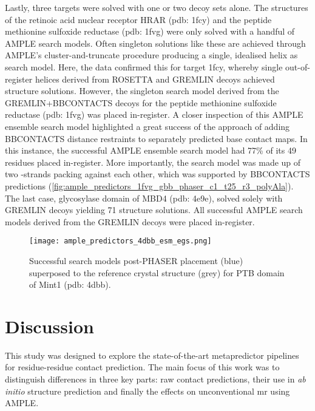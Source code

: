 Lastly, three targets were solved with one or two decoy sets alone. The structures of the retinoic acid nuclear receptor HRAR (\gls{pdb}: 1fcy) and the peptide methionine sulfoxide reductase (\gls{pdb}: 1fvg) were only solved with a handful of AMPLE search models. Often singleton solutions like these are achieved through AMPLE's cluster-and-truncate procedure producing a single, idealised helix as search model. Here, the data confirmed this for target 1fcy, whereby single out-of-register helices derived from ROSETTA and GREMLIN decoys achieved structure solutions. However, the singleton search model derived from the GREMLIN+BBCONTACTS decoys for the peptide methionine sulfoxide reductase (\gls{pdb}: 1fvg) was placed in-register. A closer inspection of this AMPLE ensemble search model highlighted a great success of the approach of adding BBCONTACTS distance restraints to separately predicted base contact maps. In this instance, the successful AMPLE ensemble search model had 77\% of its 49 residues placed in-register. More importantly, the search model was made up of two \textbeta-strands packing against each other, which was supported by BBCONTACTS predictions (\cref{fig:ample_predictors_1fvg_gbb_phaser_c1_t25_r3_polyAla}). The last case, glycosylase domain of MBD4 (\gls{pdb}: 4e9e), solved solely with GREMLIN decoys yielding 71 structure solutions. All successful AMPLE search models derived from the GREMLIN decoys were placed in-register.

\begin{figure}[H]
    \centering
    \texttt{[image: ample\_predictors\_4dbb\_esm\_egs.png]}
    \caption[Example of successfully placed AMPLE search model]{Successful search models post-PHASER placement (blue) superposed to the reference crystal structure (grey) for PTB domain of Mint1 (\gls{pdb}: 4dbb).}
    \label{fig:ample_predictors_4dbb_esm_egs}
\end{figure}

\section{Discussion}
This study was designed to explore the state-of-the-art metapredictor pipelines for residue-residue contact prediction. The main focus of this work was to distinguish differences in three key parts: raw contact predictions, their use in  \textit{ab initio} structure prediction and finally the effects on unconventional \gls{mr} using AMPLE.

